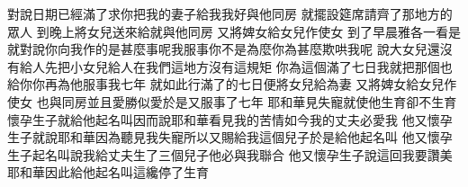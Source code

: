 對說\chientien 日期已經滿了\chientien 求你把我的妻子給我\chientien 我好與他同房\chuan 
{}就擺設筵席\chientien 請齊了那地方的眾人\chuan 
{}到晚上\chientien{}將女兒送來給\chientien{}就與他同房\chuan 
{}又將婢女給女兒作使女\chuan 
{}到了早晨\chientien 雅各一看是\chientien 就對說\chientien 你向我作的是甚麼事呢\yuentien 我服事你\chientien 不是為麼\yuentien 你為甚麼欺哄我呢\chuan 
{}說\chientien 大女兒還沒有給人\chientien 先把小女兒給人\chientien 在我們這地方沒有這規矩\chuan 
{}你為這個滿了七日\chientien 我就把那個也給你\chientien 你再為他服事我七年\chuan 
{}就如此行\yuentien 滿了的七日\chientien{}便將女兒給為妻\chuan{}
又將婢女給女兒作使女\chuan 
{}也與同房\chientien 並且愛勝似愛\yuentien 於是又服事了七年\chuan\Chuan
{}耶和華見失寵\chientien{}\linebreak{}就使他生育\yuentien{}卻不生育\chuan 
{}懷孕生子\chientien 就給他起名叫\chientien{}因而說\chientien 耶和華看見我的苦情\chientien 如今我的丈夫必愛我\chuan 
{}他又懷孕生子\chientien 就說\chientien 耶和華因為聽見我失寵\chientien 所以又賜給我這個兒子\yuentien 於是給他起名叫\chuan{}
他又懷孕生子\chientien 起名叫\chientien{}說\chientien 我給丈夫生了三個兒子\chientien 他必與我聯合\chuan 
{}他又懷孕生子\chientien 說\chientien 這回我要讚美耶和華\chientien 因此給他起名叫\yuentien{}這纔停了生育\chuan 
